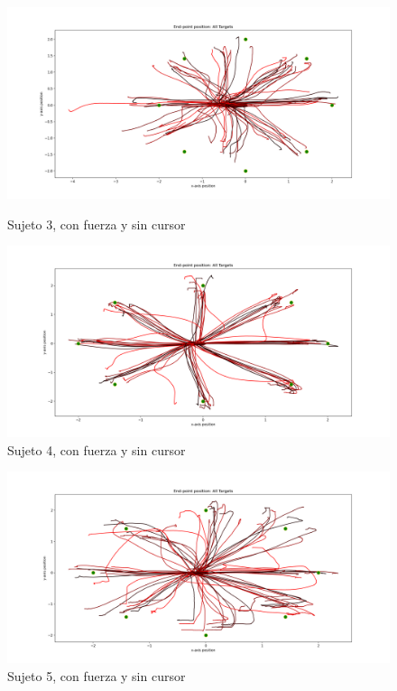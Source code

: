 \documentclass[a4paper,11pt, oneside]{book}
\begin{document}
\begin{figure}[H]
	\begin{minipage}[b]{0.5\linewidth}
		\centering
		\includegraphics[width=\linewidth]{sujeto3/force_no_cursor/trayectorias}
		\caption{Sujeto 3, con fuerza y sin cursor}
		\label{fig:figura1}
	\end{minipage}
	\hspace{0.5cm}
	\begin{minipage}[b]{0.5\linewidth}
		\centering
		\includegraphics[width=\linewidth]{sujeto4/force_no_cursor/trayectorias}
		\caption{Sujeto 4, con fuerza y sin cursor}
		\label{fig:figura2}
	\end{minipage}
\end{figure}
\begin{figure}[H]
	\begin{minipage}[b]{0.5\linewidth}
		\centering
		\includegraphics[width=\linewidth]{sujeto5/force_no_cursor/trayectorias}
		\caption{Sujeto 5, con fuerza y sin cursor}
		\label{fig:figura1}
	\end{minipage}
\end{figure}
\end{document}
